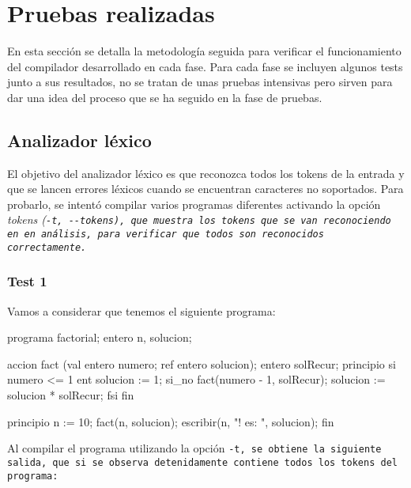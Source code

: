 \section{Pruebas realizadas}
En esta sección se detalla la metodología seguida para verificar el funcionamiento del compilador desarrollado en cada fase. Para cada fase se incluyen algunos tests junto a sus resultados, no se tratan de unas pruebas intensivas pero sirven para dar una idea del proceso que se ha seguido en la fase de pruebas.

\subsection{Analizador léxico}
El objetivo del analizador léxico es que reconozca todos los tokens de la entrada y que se lancen errores léxicos cuando se encuentran caracteres no soportados. Para probarlo, se intentó compilar varios programas diferentes activando la opción \it{tokens} (\tt{-t}, \tt{-{}-tokens}), que muestra los tokens que se van reconociendo en en análisis, para verificar que todos son reconocidos correctamente.

\subsubsection{Test 1}
Vamos a considerar que tenemos el siguiente programa:

\begin{codigo}[style=minileng,numbers=left]
programa factorial;
entero n, solucion;

accion fact (val entero numero; ref entero solucion);
entero solRecur;
principio
	si numero <= 1 ent
		solucion := 1;
	si_no
	  	fact(numero - 1, solRecur);
		solucion := solucion * solRecur;
	fsi
fin

principio
	n := 10;
	fact(n, solucion);
	escribir(n, "! es: ", solucion);
fin
\end{codigo}

Al compilar el programa utilizando la opción \tt{-t}, se obtiene la siguiente salida, que si se observa detenidamente contiene todos los tokens del programa:

